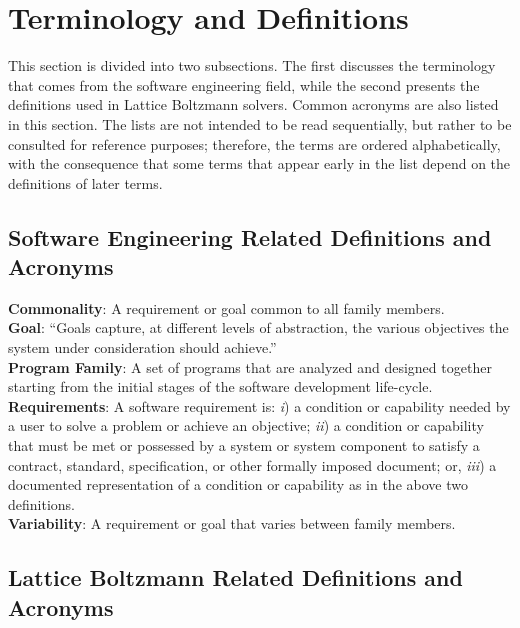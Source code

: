 \documentclass[12pt]{article}
\begin{document}
\newpage
\section{Terminology and Definitions}
This section is divided into two subsections. The first discusses the terminology that comes from the software engineering field, while the second presents the definitions used in Lattice Boltzmann solvers. Common acronyms are also listed in this section. The lists are not intended to be read sequentially, but rather to be consulted for reference purposes; therefore, the terms are ordered alphabetically, with the consequence that some terms that appear early in the list depend on the definitions of later terms.

\subsection{Software Engineering Related Definitions and Acronyms}
\noindent\textbf{Commonality}: A requirement or goal common to all family members.\\

\noindent\textbf{Goal}: “Goals capture, at different levels of abstraction, the various objectives the system under consideration should achieve.” \cite{van2001goal}\\

\noindent\textbf{Program Family}: A set of programs that are analyzed and designed together starting from the initial stages of the software development life-cycle.\\

\noindent\textbf{Requirements}: A software requirement is: \textit{i}) a condition or capability needed by a user to solve a problem or achieve an objective; \textit{ii}) a condition or capability that must be met or possessed by a system or system component to satisfy a contract, standard, specification, or other formally imposed document; or, \textit{iii}) a documented representation of a condition or capability as in the above two definitions. \cite{thayer2000ieee}\\

\noindent\textbf{Variability}: A requirement or goal that varies between family members.

\subsection{Lattice Boltzmann Related Definitions and Acronyms}
\end{document}
